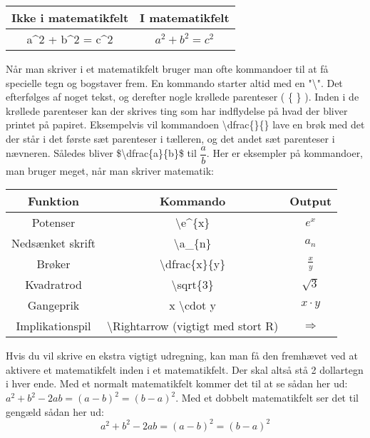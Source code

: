 \documentclass[titlepage]{article}
\begin{document}
\begin{center}
\begin{tabular}{|c|c|}
	\hline Ikke i matematikfelt & I matematikfelt\\ \hline
	a\^{}2 + b\^{}2 = c\^{}2 & $a^2 + b^2 = c^2$ \\ \hline
\end{tabular}
\end{center}

Når man skriver i et matematikfelt bruger man ofte kommandoer til at få specielle tegn og bogstaver frem.
En kommando starter altid med en "\textbackslash ".
Det efterfølges af noget tekst, og derefter nogle krøllede parenteser ( \{ \} ). 
Inden i de krøllede parenteser kan der skrives ting som har indflydelse på hvad der bliver printet på papiret. 
Eksempelvis vil kommandoen \textbackslash dfrac\{\}\{\} lave en brøk med det der står i det første sæt parenteser i tælleren, og det andet sæt parenteser i nævneren.
Således bliver \$\textbackslash dfrac\{a\}\{b\}\$ til $\dfrac{a}{b}$.
Her er eksempler på kommandoer, man bruger meget, når man skriver matematik:
\bigskip

\begin{center}
\begin{tabular}{|c|c|c|}
	 \hline
	 \textbf{Funktion} & \textbf{Kommando} & \textbf{Output} \\ \hline
	 Potenser & \textbackslash e\^{}\{x\} & $e^x$ \\ \hline
	 Nedsænket skrift & \textbackslash a\_\{n\} & $a_{n}$ \\ \hline
	 Brøker & \textbackslash dfrac\{x\}\{y\} & $\frac{x}{y}$ \\ \hline
	 Kvadratrod & \textbackslash sqrt\{3\} & $\sqrt{3}$\\ \hline
	 Gangeprik & x \textbackslash cdot y & $x \cdot y$\\ \hline
	 Implikationspil & \textbackslash Rightarrow (vigtigt med stort R) & $\Rightarrow$\\ \hline
\end{tabular}
\end{center}

Hvis du vil skrive en ekstra vigtigt udregning, kan man få den fremhævet ved at aktivere et matematikfelt inden i et matematikfelt. 
Der skal altså stå 2 dollartegn i hver ende. 
Med et normalt matematikfelt kommer det til at se sådan her ud: $a^2+b^2-2ab=(a-b)^2=(b-a)^2$. Med et dobbelt matematikfelt ser det til gengæld sådan her ud: $$a^2+b^2-2ab=(a-b)^2=(b-a)^2$$
\end{document}
